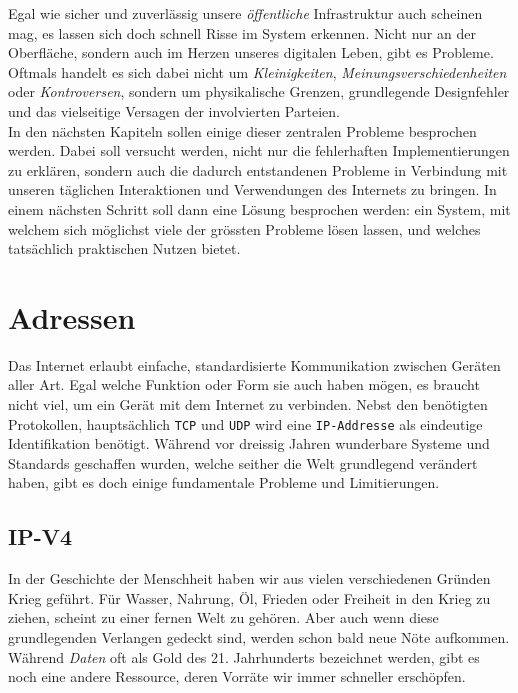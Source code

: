 \documentclass[a4paper,11pt,titlepage,twoside]{memoir}
\begin{document}
\noindent Egal wie sicher und zuverlässig unsere \emph{öffentliche}
Infrastruktur auch scheinen mag, es lassen sich doch schnell Risse im
System erkennen. Nicht nur an der Oberfläche, sondern auch im Herzen
unseres digitalen Leben, gibt es Probleme. Oftmals handelt es sich
dabei nicht um \emph{Kleinigkeiten}, \emph{Meinungsverschiedenheiten} oder
\emph{Kontroversen}, sondern um physikalische Grenzen, grundlegende
Designfehler und das vielseitige Versagen der involvierten Parteien.\\

\noindent In den nächsten Kapiteln sollen einige dieser zentralen
Probleme besprochen werden. Dabei soll versucht werden, nicht nur die
fehlerhaften Implementierungen zu erklären, sondern auch die dadurch
entstandenen Probleme in Verbindung mit unseren täglichen
Interaktionen und Verwendungen des Internets zu bringen. In einem
nächsten Schritt soll dann eine Lösung besprochen werden: ein System,
mit welchem sich möglichst viele der grössten Probleme lösen lassen,
und welches tatsächlich praktischen Nutzen bietet.\\
\section{Adressen}
\label{sec:orgd9419bc}
Das Internet erlaubt einfache, standardisierte Kommunikation zwischen
Geräten aller Art. Egal welche Funktion oder Form sie auch haben
mögen, es braucht nicht viel, um ein Gerät mit dem Internet zu
verbinden. Nebst den benötigten Protokollen, hauptsächlich \texttt{TCP} und \texttt{UDP}
wird eine \texttt{IP-Addresse} als eindeutige Identifikation benötigt. Während
vor dreissig Jahren wunderbare Systeme und Standards geschaffen wurden,
welche seither die Welt grundlegend verändert haben, gibt es doch
einige fundamentale Probleme und Limitierungen.
\subsection{IP-V4}
\label{sec:orgef76ee6}
\noindent In der Geschichte der Menschheit haben wir aus vielen
verschiedenen Gründen Krieg geführt. Für Wasser, Nahrung, Öl, Frieden
oder Freiheit in den Krieg zu ziehen, scheint zu einer fernen Welt zu
gehören. Aber auch wenn diese grundlegenden Verlangen gedeckt sind,
werden schon bald neue Nöte aufkommen. Während \emph{Daten} oft als Gold
des 21. Jahrhunderts bezeichnet werden, gibt es noch eine andere
Ressource, deren Vorräte wir immer schneller erschöpfen. \\
\end{document}
